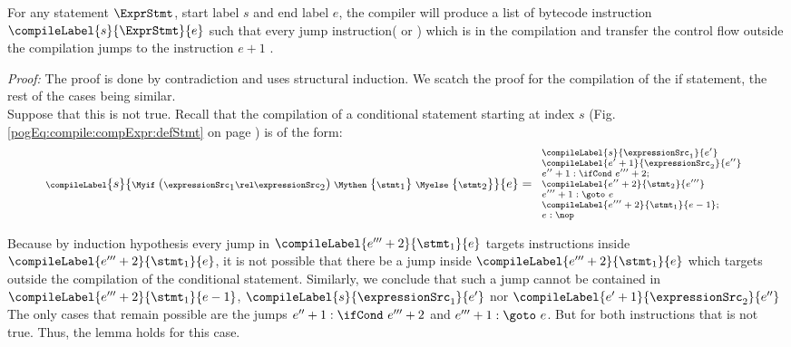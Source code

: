 \begin{compPropApp}\label{compile:prop:compProp1}

    For any statement $\ExprStmt $, start label $s$ and end label $e$,
    the compiler will produce a list of bytecode instruction $\compileLabel{s}{\ExprStmt}{e}$ such that every jump instruction(\goto {} or \ifCond) which is in the compilation 
    and transfer the control flow outside the compilation jumps to the instruction $e + 1$  .

\end{compPropApp}
\textit{Proof:} 
The proof is done by contradiction and uses structural induction. 
We scatch the proof for the compilation of the if statement, the rest of the cases being similar. \\
Suppose that this is not true.
Recall that the compilation of a conditional statement starting at index $s$  
(Fig. \ref{pogEq:compile:compExpr:defStmt} on page \pageref{pogEq:compile:compExpr:defStmt}) is of the form:
$${\scriptsize \compileLabel{s}{ \Myif \ ( \expressionSrc_1 \rel \expressionSrc_2 ) \ \Mythen \ \{ \stmt_1 \}  \  \Myelse \ \{ \stmt_2 \}   }{e}= 
\begin{array}{l}
\compileLabel{s}{\expressionSrc_1}{e'} \\
\compileLabel{e'+1}{\expressionSrc_2}{e''}\\ 
 e'' + 1: \ifCond \ e''' + 2; \\
 \compileLabel{e'' + 2}{\stmt_2}{e'''}\\
 e''' + 1: \goto \ e\\  
\compileLabel{e''' +  2}{\stmt_1}{ e -1 };\\
 e : \nop
\end{array}}
		    $$
 
Because by induction hypothesis every jump in  $\compileLabel{e''' +  2}{\stmt_1}{ e} $ targets  instructions inside $\compileLabel{e''' +  2}{\stmt_1}{ e} $,
 it  is not possible that there be  a jump  inside 
$\compileLabel{e''' +  2}{\stmt_1}{ e} $  which targets outside the compilation of the conditional statement.
 Similarly, we conclude that such a  jump cannot be contained in 
$\compileLabel{e''' +  2}{\stmt_1}{ e -1  } $, $ \compileLabel{s}{\expressionSrc_1}{e'}$ nor $\compileLabel{e'+1}{\expressionSrc_2}{e''}$
The only cases that remain possible are the  jumps  $ e'' + 1: \ifCond \ e''' + 2 $  and $ e''' + 1: \goto \ e  $.
 But for both instructions that is not true. Thus, the lemma holds for this case.

